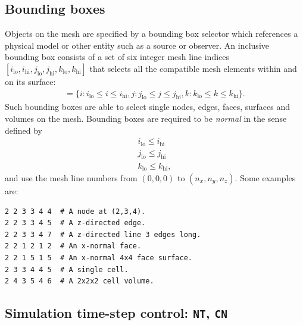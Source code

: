 \documentclass[onecolumn,a4paper]{article}
\numberwithin{equation}{section}
\begin{document}
\subsection{Bounding boxes}
Objects on the mesh are specified by a bounding box selector which references a physical model or other
entity such as a source or observer. An inclusive bounding box consists of a set of six integer mesh line indices 
$[i_\mathrm{lo},i_\mathrm{hi},j_\mathrm{lo},j_\mathrm{hi},k_\mathrm{lo},k_\mathrm{hi}]$ that selects all the
compatible mesh elements within and on its surface:
\begin{eqnarray}
[i_\mathrm{lo},i_\mathrm{hi},j_\mathrm{lo},j_\mathrm{hi},k_\mathrm{lo},k_\mathrm{hi}] =
\{ i: i_\mathrm{lo} \le i \le i_\mathrm{hi},
   j: j_\mathrm{lo} \le j \le j_\mathrm{hi},
   k: k_\mathrm{lo} \le k \le k_\mathrm{hi}\}. \nonumber
\end{eqnarray}
Such bounding boxes are able to select single nodes, edges, faces, surfaces and volumes on the mesh.
Bounding boxes are required to be {\em normal} in the sense defined by
\begin{eqnarray}
i_\mathrm{lo} \le i_\mathrm{hi} \nonumber \\
j_\mathrm{lo} \le j_\mathrm{hi} \nonumber \\  
k_\mathrm{lo} \le k_\mathrm{hi},
\label{eq:normalbbox}
\end{eqnarray}
and use the mesh line numbers from $(0,0,0)$ to $(n_x,n_y,n_z)$.
Some examples are:
\begin{verbatim}
2 2 3 3 4 4  # A node at (2,3,4).
2 2 3 3 4 5  # A z-directed edge.
2 2 3 3 4 7  # A z-directed line 3 edges long.
2 2 1 2 1 2  # An x-normal face.
2 2 1 5 1 5  # An x-normal 4x4 face surface.
2 3 3 4 4 5  # A single cell.
2 4 3 5 4 6  # A 2x2x2 cell volume.
\end{verbatim}

\subsection{Simulation time-step control: \texttt{NT}, \texttt{CN}}
\end{document}
